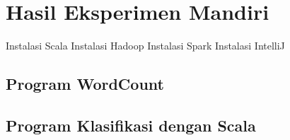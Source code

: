 \chapter{Hasil Eksperimen Mandiri}
\label{chap:eksmandiri}

Instalasi Scala
Instalasi Hadoop
Instalasi Spark
Instalasi IntelliJ

\section{Program WordCount}
\label{sec:wordcount} 



\section{Program Klasifikasi dengan Scala}
\label{sec:klasifikasi} 